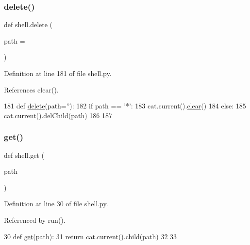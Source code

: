 \subsubsection{\texorpdfstring{delete()}{delete()}}
{\footnotesize\ttfamily def shell.\+delete (\begin{DoxyParamCaption}\item[{}]{path = {\ttfamily \textquotesingle{}\textquotesingle{}} }\end{DoxyParamCaption})}



Definition at line 181 of file shell.\+py.



References clear().


\begin{DoxyCode}
181 \textcolor{keyword}{def }\hyperlink{namespaceshell_a324876531afa651f59288dbab3f5603a}{delete}(path=''):
182   \textcolor{keywordflow}{if} path == \textcolor{stringliteral}{'*'}:
183     cat.current().\hyperlink{namespaceshell_a14da1173b3cc5b8569cc0020130e3bd7}{clear}()
184   \textcolor{keywordflow}{else}:
185     cat.current().delChild(path)
186 
187 
\end{DoxyCode}
\mbox{\label{namespaceshell_a4b477089a422d9adc38334764718c485}} 
\subsubsection{\texorpdfstring{get()}{get()}}
{\footnotesize\ttfamily def shell.\+get (\begin{DoxyParamCaption}\item[{}]{path }\end{DoxyParamCaption})}



Definition at line 30 of file shell.\+py.



Referenced by run().


\begin{DoxyCode}
30 \textcolor{keyword}{def }\hyperlink{namespaceshell_a4b477089a422d9adc38334764718c485}{get}(path):
31   \textcolor{keywordflow}{return} cat.current().child(path)
32 
33 
\end{DoxyCode}
\mbox{\label{namespaceshell_aa0929fa150d13168df6061f9d51b727b}} 
